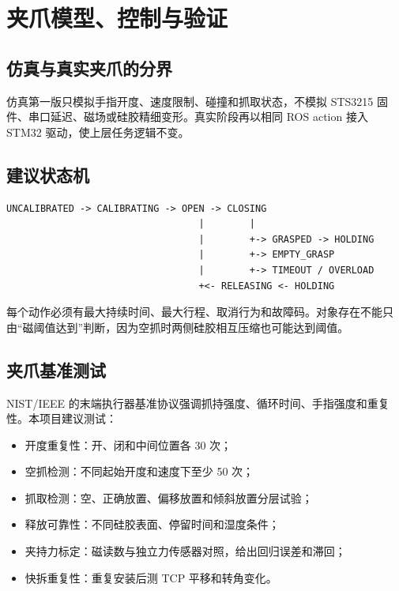\documentclass[UTF8,12pt,oneside]{ctexrep}
\begin{document}
\chapter{夹爪模型、控制与验证}

\section{仿真与真实夹爪的分界}

仿真第一版只模拟手指开度、速度限制、碰撞和抓取状态，不模拟 STS3215 固件、串口延迟、磁场或硅胶精细变形。真实阶段再以相同 ROS action 接入 STM32 驱动，使上层任务逻辑不变。

\section{建议状态机}

\begin{lstlisting}
UNCALIBRATED -> CALIBRATING -> OPEN -> CLOSING
                                  |        |
                                  |        +-> GRASPED -> HOLDING
                                  |        +-> EMPTY_GRASP
                                  |        +-> TIMEOUT / OVERLOAD
                                  +<- RELEASING <- HOLDING
\end{lstlisting}

每个动作必须有最大持续时间、最大行程、取消行为和故障码。对象存在不能只由“磁阈值达到”判断，因为空抓时两侧硅胶相互压缩也可能达到阈值。

\section{夹爪基准测试}

NIST/IEEE 的末端执行器基准协议强调抓持强度、循环时间、手指强度和重复性\cite{falco2020gripperbench}。本项目建议测试：

\begin{itemize}
  \item 开度重复性：开、闭和中间位置各 30 次；
  \item 空抓检测：不同起始开度和速度下至少 50 次；
  \item 抓取检测：空、正确放置、偏移放置和倾斜放置分层试验；
  \item 释放可靠性：不同硅胶表面、停留时间和湿度条件；
  \item 夹持力标定：磁读数与独立力传感器对照，给出回归误差和滞回；
  \item 快拆重复性：重复安装后测 TCP 平移和转角变化。
\end{itemize}
\end{document}

